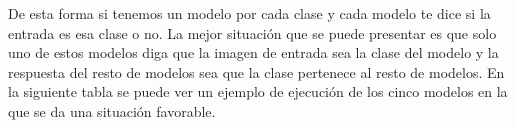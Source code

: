 \documentclass[12pt,a4paper]{article}
\begin{document}
De esta forma si tenemos un modelo por cada clase y cada modelo te dice si la entrada es esa clase o no. La mejor situación que se puede presentar es que solo uno de estos modelos diga que la imagen de entrada sea la clase del modelo y la respuesta del resto de modelos sea que la clase pertenece al resto de modelos. En la siguiente tabla se puede ver un ejemplo de ejecución de los cinco modelos en la que se da una situación favorable.

\begin{table}[H]
\centering
{}
\caption{Ejemplo situación favorable.}
\end{table}
\end{document}
